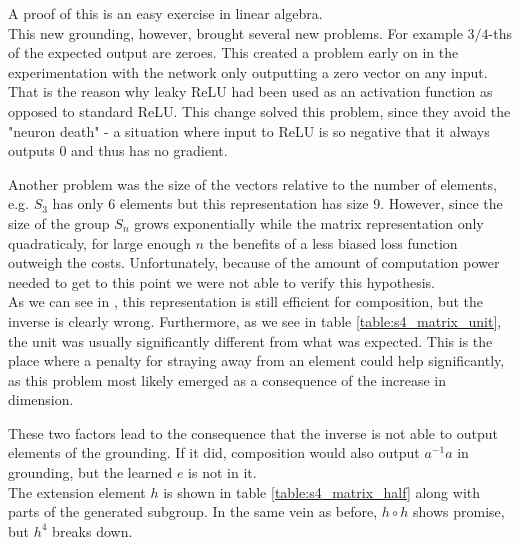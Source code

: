 A proof of this is an easy exercise in linear algebra. \\

This new grounding, however, brought several new problems. For example $3/4$-ths of the expected output are zeroes. This created a problem early on in the experimentation with the network only outputting a zero vector on any input. That is the reason why leaky ReLU had been used as an activation function as opposed to standard ReLU. This change solved this problem, since they avoid the "neuron death" - a situation where input to ReLU is so negative that it always outputs 0 and thus has no gradient.

Another problem was the size of the vectors relative to the number of elements, e.g. $S_3$ has only 6 elements but this representation has size 9. However, since the size of the group $S_n$ grows exponentially while the matrix representation only quadraticaly, for large enough $n$ the benefits of a less biased loss function outweigh the costs. Unfortunately, because of the amount of computation power needed to get to this point we were not able to verify this hypothesis.\\

As we can see in , this representation is still  efficient for composition, but the inverse is clearly wrong. Furthermore, as we see in table \ref{table:s4_matrix_unit}, the unit was usually significantly different from what was expected. This is the place where a penalty for straying away from an element could help significantly, as this problem most likely emerged as a consequence of the increase in dimension.

These two factors lead to the consequence that the inverse is not able to output elements of the grounding. If it did, composition would also output $a^{-1}a$ in grounding, but the learned $e$ is not in it.\\

The extension element $h$ is shown in table \ref{table:s4_matrix_half} along with parts of the generated subgroup. In the same vein as before, $h\circ h$ shows promise, but $h^4$ breaks down.

